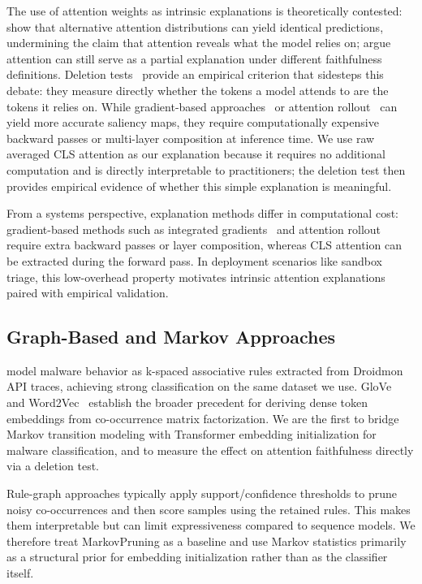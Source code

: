 \documentclass[12pt]{report}
\begin{document}
The use of attention weights as
intrinsic explanations is theoretically contested: \citet{jain2019attention} show that alternative attention
distributions can yield identical predictions, undermining the claim
that attention reveals what the model relies on; \citet{wiegreffe2019attention} argue attention can still serve
as a partial explanation under different faithfulness definitions.
Deletion tests~\citep{samek2017evaluating} provide an empirical criterion that sidesteps this debate: they measure directly
whether the tokens a model attends to are the tokens it relies on.
While gradient-based approaches~\citep{sundararajan2017integrated} or
attention rollout~\citep{abnar2020rollout} can yield more accurate saliency maps,
they require computationally expensive backward passes or multi-layer
composition at inference time. We use raw averaged CLS attention as our explanation
because it requires no additional computation and is directly
interpretable to practitioners; the deletion test then provides
empirical evidence of whether this simple explanation is meaningful.

From a systems perspective, explanation methods differ in computational
cost: gradient-based methods such as integrated
gradients~\citep{sundararajan2017integrated} and attention
rollout~\citep{abnar2020rollout} require extra backward passes or layer
composition, whereas CLS attention can be extracted during the forward
pass. In deployment scenarios like sandbox triage, this low-overhead
property motivates intrinsic attention explanations paired with
empirical validation.

\subsection{Graph-Based and Markov Approaches}
\citet{dangelo2023kspaced} model malware behavior as
k-spaced associative rules extracted from Droidmon API traces, achieving
strong classification on the same dataset we use.
GloVe~\citep{pennington2014glove} and Word2Vec~\citep{mikolov2013word2vec}
establish the broader precedent for deriving dense token embeddings from
co-occurrence matrix factorization. We are the first to bridge Markov
transition modeling with Transformer embedding initialization for malware
classification, and to measure the effect on attention faithfulness
directly via a deletion test.

Rule-graph approaches typically apply support/confidence thresholds to
prune noisy co-occurrences and then score samples using the retained
rules. This makes them interpretable but can limit expressiveness
compared to sequence models. We therefore treat MarkovPruning as a
baseline and use Markov statistics primarily as a structural prior for
embedding initialization rather than as the classifier itself.
\end{document}
